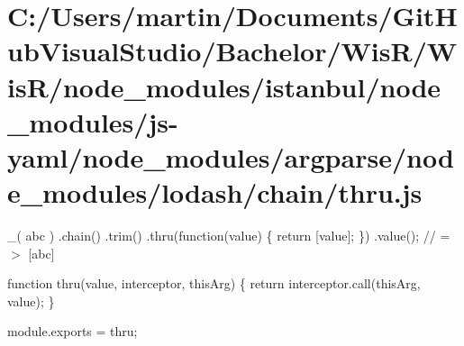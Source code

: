 \hypertarget{_c_1_2_users_2martin_2_documents_2_git_hub_visual_studio_2_bachelor_2_wis_r_2_wis_r_2node_module27a13c180df351666d836523f503db2c}{}\section{C\+:/\+Users/martin/\+Documents/\+Git\+Hub\+Visual\+Studio/\+Bachelor/\+Wis\+R/\+Wis\+R/node\+\_\+modules/istanbul/node\+\_\+modules/js-\/yaml/node\+\_\+modules/argparse/node\+\_\+modules/lodash/chain/thru.\+js}
\+\_\+(\textquotesingle{} abc \textquotesingle{}) .chain() .trim() .thru(function(value) \{ return \mbox{[}value\mbox{]}; \}) .value(); // =$>$ \mbox{[}\textquotesingle{}abc\textquotesingle{}\mbox{]}


\begin{DoxyCodeInclude}

\textcolor{keyword}{function} thru(value, interceptor, thisArg) \{
  \textcolor{keywordflow}{return} interceptor.call(thisArg, value);
\}

module.exports = thru;
\end{DoxyCodeInclude}
 